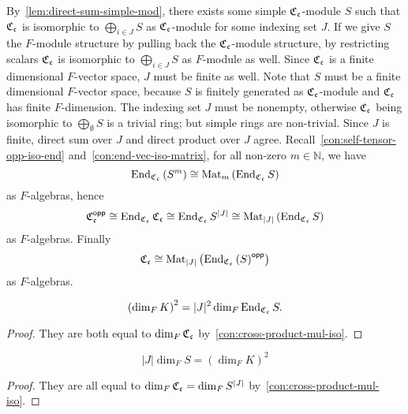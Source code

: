 \begin{construction}\label{con:cross-product-mul-iso}
  By~\cref{lem:direct-sum-simple-mod}, there exists some simple $\operatorname{\mathfrak{C}}_{\mathfrak{c}}$-module $S$ such that $\operatorname{\mathfrak{C}}_{\mathfrak{c}}$ is isomorphic to $\bigoplus_{i\in J}S$ as $\operatorname{\mathfrak{C}}_{\mathfrak{c}}$-module for some indexing set $J$. If we give $S$ the $F$-module structure by pulling back the $\operatorname{\mathfrak{C}}_{\mathfrak{c}}$-module structure, by restricting scalars $\operatorname{\mathfrak{C}}_{\mathfrak{c}}$ is isomorphic to $\bigoplus_{i\in J} S$ as $F$-module as well. Since $\operatorname{\mathfrak{C}}_{\mathfrak{c}}$ is a finite dimensional $F$-vector space, $J$ must be finite as well. Note that $S$ must be a finite dimensional $F$-vector space, because $S$ is finitely generated as $\operatorname{\mathfrak{C}}_{\mathfrak{c}}$-module and $\operatorname{\mathfrak{C}}_{\mathfrak{c}}$ has finite $F$-dimension.
  The indexing set $J$ must be nonempty, otherwise $\operatorname{\mathfrak{C}}_{\mathfrak{c}}$ being isomorphic to $\bigoplus_{\emptyset} S$ is a trivial ring; but simple rings are non-trivial. Since $J$ is finite, direct sum over $J$ and direct product over $J$ agree.
  Recall~\cref{con:self-tensor-opp-iso-end} and~\cref{con:end-vec-iso-matrix}, for all non-zero $m \in\mathbb{N}$, we have
  \[
    \operatorname{End}_{\operatorname{\mathfrak{C}}_{\mathfrak{c}}}\left(S^{m}\right) \cong \operatorname{Mat}_{m}\left(\operatorname{End}_{\operatorname{\mathfrak{C}}_{\mathfrak{c}}}S\right)
  \]
  as $F$-algebras, hence
  \[
    \operatorname{\mathfrak{C}}_{\mathfrak{c}}^{\mathsf{opp}} \cong \operatorname{End}_{\operatorname{\mathfrak{C}}_{\mathfrak{c}}}\operatorname{\mathfrak{C}}_{\mathfrak{c}}\cong \operatorname{End}_{\operatorname{\mathfrak{C}}_{\mathfrak{c}}}S^{|J|} \cong \operatorname{Mat}_{|J|}\left(\operatorname{End}_{\operatorname{\mathfrak{C}}_{\mathfrak{c}}}S\right)
  \]
  as $F$-algebras.
  Finally
  \[
    \operatorname{\mathfrak{C}}_{\mathfrak{c}}\cong \operatorname{Mat}_{|J|}\left(\operatorname{End}_{\operatorname{\mathfrak{C}}_{\mathfrak{c}}}\left(S\right)^{\mathsf{opp}}\right)
  \]
  as $F$-algebras.
  \leanok
\end{construction}

\begin{corollary}\label{cor:dim-eq-1}
  \[
    \left(\dim_{F}K\right)^{2} = |J|^{2}\dim_{F}\operatorname{End}_{\operatorname{\mathfrak{C}}_{\mathfrak{c}}}S.
  \]
\end{corollary}
\begin{proof}
  They are both equal to $\dim_{F}\operatorname{\mathfrak{C}}_{\mathfrak{c}}$ by~\cref{con:cross-product-mul-iso}.
\end{proof}

\begin{corollary}\label{cor:dim-eq-2}
  \[
    |J|\dim_{F}S = \left(\dim_{F}K\right)^{2}
  \]
  \leanok
\end{corollary}
\begin{proof}
  They are all equal to $\dim_{F}\operatorname{\mathfrak{C}}_{\mathfrak{c}} = \dim_{F}S^{|J|}$ by~\cref{con:cross-product-mul-iso}.
\end{proof}

